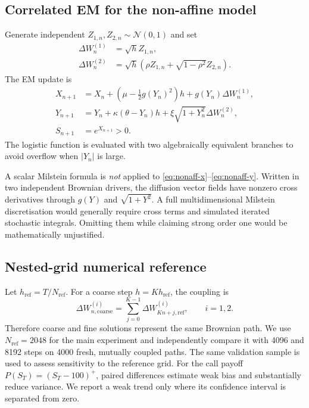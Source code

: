 \documentclass[11pt,a4paper]{article}
\theoremstyle{definition}
\theoremstyle{remark}
\begin{document}
\subsection{Correlated EM for the non-affine model}
Generate independent $Z_{1,n},Z_{2,n}\sim\mathcal N(0,1)$ and set
\begin{align}
 \Delta W_n^{(1)}&=\sqrt h Z_{1,n},\\
 \Delta W_n^{(2)}&=\sqrt h\left(\rho Z_{1,n}+\sqrt{1-\rho^2}Z_{2,n}\right).
 \label{eq:corr-inc}
\end{align}
The EM update is
\begin{align}
 X_{n+1}&=X_n+\left(\mu-\tfrac12g(Y_n)^2\right)h
              +g(Y_n)\Delta W_n^{(1)},
 \label{eq:em-x}\\
 Y_{n+1}&=Y_n+\kappa(\theta-Y_n)h
              +\xi\sqrt{1+Y_n^2}\Delta W_n^{(2)},
 \label{eq:em-y}\\
 S_{n+1}&=e^{X_{n+1}}>0.
 \label{eq:recover-s}
\end{align}
The logistic function is evaluated with two algebraically equivalent branches
to avoid overflow when $|Y_n|$ is large.

A scalar Milstein formula is \emph{not} applied to
\eqref{eq:nonaff-x}--\eqref{eq:nonaff-y}.  Written in two independent Brownian
drivers, the diffusion vector fields have nonzero cross derivatives through
$g(Y)$ and $\sqrt{1+Y^2}$.  A full multidimensional Milstein discretisation
would generally require cross terms and simulated iterated stochastic
integrals.  Omitting them while claiming strong order one would be
mathematically unjustified.

\subsection{Nested-grid numerical reference}
Let $h_{\mathrm{ref}}=T/N_{\mathrm{ref}}$.  For a coarse step $h=Kh_{\mathrm{ref}}$,
the coupling is
\begin{equation}
 \Delta W_{n,\mathrm{coarse}}^{(i)}
 =\sum_{j=0}^{K-1}\Delta W_{Kn+j,\mathrm{ref}}^{(i)},\qquad i=1,2.
 \label{eq:nested-sum}
\end{equation}
Therefore coarse and fine solutions represent the same Brownian path.  We use
$N_{\mathrm{ref}}=2048$ for the main experiment and independently compare it
with 4096 and 8192 steps on 4000 fresh, mutually coupled paths.
The same validation sample is used to assess sensitivity to the reference grid.  For the call payoff
$P(S_T)=(S_T-100)^+$, paired differences estimate weak bias and substantially
reduce variance.  We report a weak trend only where its confidence interval is
separated from zero.
\end{document}

